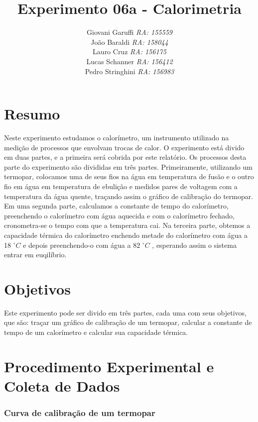 \documentclass[12pt,a4paper]{article}
\begin{document}
\title{\vspace{70mm}\Huge Experimento 06a - Calorimetria}
\author{ Giovani Garuffi\qquad\hfill
		\textit {RA: 155559}\protect\\
		João Baraldi\hfill
		\textit{RA: 158044}\protect\\
		Lauro Cruz\hfill
		\textit{RA: 156175}\protect\\
		Lucas Schanner\hfill
		\textit{RA: 156412}\protect\\
		Pedro Stringhini\hfill
		\textit {RA: 156983}								
		}
\maketitle
\newpage
\section{Resumo}
Neste experimento estudamos o calorímetro, um instrumento utilizado na medição de processos que envolvam trocas de calor.
O experimento está divido em duas partes, e a primeira será cobrida por este relatório. Os processos desta parte do experimento são divididas em três partes. Primeiramente, utilizando um termopar, colocamos uma de seus fios na água em temperatura de fusão e o outro fio em água em temperatura de ebulição e medidos pares de voltagem com a temperatura da água quente, traçando assim o gráfico de calibração do termopar.
Em uma segunda parte, calculamos a constante de tempo do calorímetro, preenchendo o calorímetro com água aquecida e com o calorímetro fechado, cronometra-se o tempo com que a temperatura cai.
Na terceira parte, obtemos a capacidade térmica do calorímetro enchendo metade do calorímetro com água a 18 $^{\circ}C$ e depois preenchendo-o com água a 82 $^{\circ}C$ , esperando assim o sistema entrar em euqilíbrio.

\section{Objetivos}
Este experimento pode ser divido em três partes, cada uma com seus objetivos, que são: traçar um gráfico de calibração de um termopar, calcular a constante de tempo de um calorímetro e calcular sua capacidade térmica.


\section{Procedimento Experimental e Coleta de Dados}


\subsubsection{Curva de calibração de um termopar}
\end{document}

